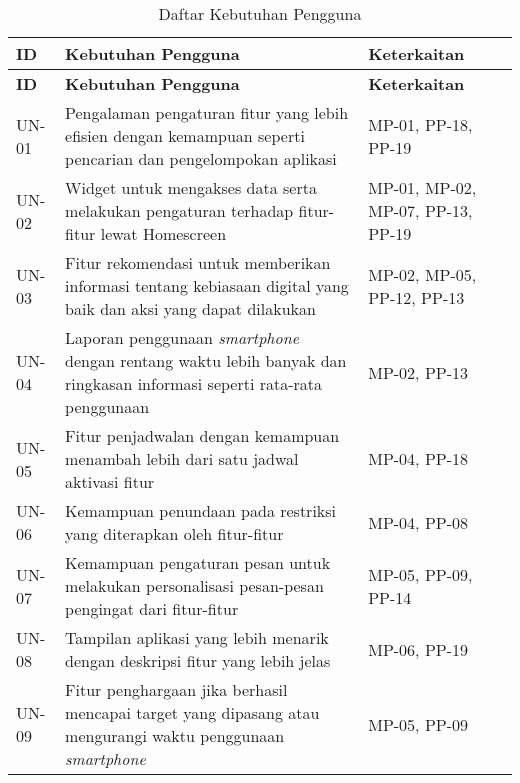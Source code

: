 \newpage

\RaggedLeft
\begin{small}
\begin{longtable}[c]{|W{c}{0.07\textwidth}|>{\ccnormspacing}m{0.65\textwidth}|>{\ccnormspacingcenter}m{0.19\textwidth}|}
  \caption{Daftar Kebutuhan Pengguna}
  \label{tab:daftar_kebutuhan} \\
  \hline {}
  \textbf{ID} & \centering\textbf{Kebutuhan Pengguna} & \textbf{Keterkaitan} \\ \hline \endfirsthead
  \hline {}
  \textbf{ID} & \centering\textbf{Kebutuhan Pengguna} & \textbf{Keterkaitan} \\ \hline \endhead

  \hline \endfoot

  UN-01  & Pengalaman pengaturan fitur yang lebih efisien dengan kemampuan seperti pencarian dan pengelompokan aplikasi & MP-01, PP-18, PP-19 \\ \hline
  UN-02  & Widget untuk mengakses data serta melakukan pengaturan terhadap fitur-fitur lewat Homescreen & MP-01, MP-02, MP-07, PP-13, PP-19 \\ \hline
  UN-03  & Fitur rekomendasi untuk memberikan informasi tentang kebiasaan digital yang baik dan aksi yang dapat dilakukan & MP-02, MP-05, PP-12, PP-13 \\ \hline
  UN-04  & Laporan penggunaan \textit{smartphone} dengan rentang waktu lebih banyak dan ringkasan informasi seperti rata-rata penggunaan & MP-02, PP-13 \\ \hline
  UN-05  & Fitur penjadwalan dengan kemampuan menambah lebih dari satu jadwal aktivasi fitur & MP-04, PP-18  \\ \hline
  UN-06  & Kemampuan penundaan pada restriksi yang diterapkan oleh fitur-fitur & MP-04, PP-08 \\ \hline
  UN-07  & Kemampuan pengaturan pesan untuk melakukan personalisasi pesan-pesan pengingat dari fitur-fitur & MP-05, PP-09, PP-14 \\ \hline
  UN-08  & Tampilan aplikasi yang lebih menarik dengan deskripsi fitur yang lebih jelas & MP-06, PP-19 \\ \hline
  UN-09  & Fitur penghargaan jika berhasil mencapai target yang dipasang atau mengurangi waktu penggunaan \textit{smartphone} & MP-05, PP-09 \\ \hline
\end{longtable}
\end{small}
\justifying
\FloatBarrier

